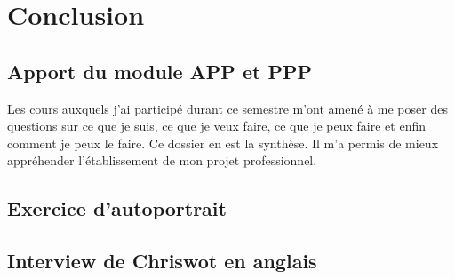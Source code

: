 \documentclass[a4paper,12pt, draft]{report}
\begin{document}
\part{Conclusion}
\chapter{Apport du module APP et PPP}
Les cours auxquels j'ai participé durant ce semestre m'ont amené à me poser des questions sur ce que je suis, ce que je veux faire, ce que je peux faire et enfin comment je peux le faire.
Ce dossier en est la synthèse. Il m'a permis de mieux appréhender l'établissement de mon projet professionnel.

\listoftables{}

\tableofcontents{}


\appendix
\chapter{Exercice d'autoportrait}\label{autoportrait}


\chapter{Interview de Chriswot en anglais}\label{chriswot_en}
\end{document}
